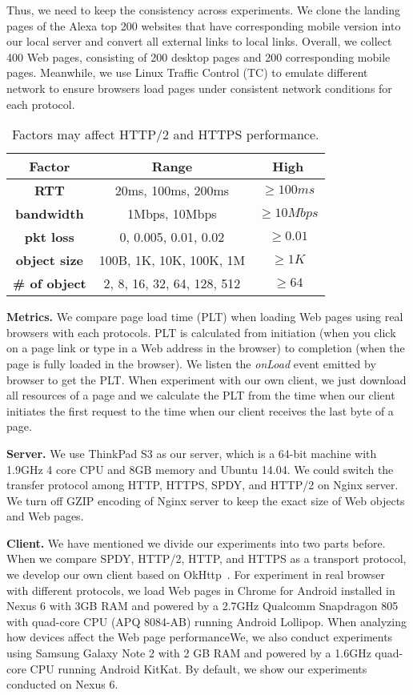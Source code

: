 Thus, we need to keep the consistency across experiments. We clone the landing pages of the Alexa top 200 websites that have corresponding mobile version into our local server and convert all external links to local links. Overall, we collect 400 Web pages, consisting of 200 desktop pages and 200 corresponding mobile pages. Meanwhile, we use Linux Traffic Control (TC) to emulate different network to ensure browsers load pages under consistent network conditions for each protocol.

\begin{table}[!htbp]\centering
\caption{Factors may affect HTTP/2 and HTTPS performance.}\label{tab:factors}
\normalsize
\begin{tabular}{|c|c|c|}
\toprule
    \textbf{Factor} & \textbf{Range} & \textbf{High}\\
\midrule
    \textbf{RTT} & 20ms, 100ms, 200ms & $ \geq 100ms $\\
    \hline
    \textbf{bandwidth} & 1Mbps, 10Mbps & $ \geq 10Mbps $\\
    \hline
    \textbf{pkt loss} & 0, 0.005, 0.01, 0.02 & $ \geq 0.01 $\\
    \hline
    \textbf{object size} & 100B, 1K, 10K, 100K, 1M & $ \geq 1K $\\
    \hline
    \textbf{\# of object} & 2, 8, 16, 32, 64, 128, 512 & $ \geq 64 $\\
\bottomrule
\end{tabular}
\end{table}

\textbf{Metrics.} We compare page load time (PLT) when loading Web pages using real browsers with each protocols. PLT is calculated from initiation (when you click on a page link or type in a Web address in the browser) to completion (when the page is fully loaded in the browser). We listen the \textit{onLoad} event emitted by browser to get the PLT. When experiment with our own client, we just download all resources of a page and we calculate the PLT from the time when our client initiates the first request to the time when our client receives the last byte of a page.

\textbf{Server.} We use ThinkPad S3 as our server, which is a 64-bit machine with 1.9GHz 4 core CPU and 8GB memory and Ubuntu 14.04. We could switch the transfer protocol among HTTP, HTTPS, SPDY, and HTTP/2 on Nginx server. We turn off GZIP encoding of Nginx server to keep the exact size of Web objects and Web pages.

\textbf{Client.} We have mentioned we divide our experiments into two parts before. When we compare SPDY, HTTP/2, HTTP, and HTTPS as a transport protocol, we develop our own client based on OkHttp~\cite{okhttp}. For experiment in real browser with different protocols, we load Web pages in Chrome for Android installed in Nexus 6 with 3GB RAM and powered by a 2.7GHz Qualcomm Snapdragon 805 with quad-core CPU (APQ 8084-AB) running Android Lollipop. When analyzing how devices affect the Web page performanceWe, we also conduct experiments using Samsung Galaxy Note 2 with 2 GB RAM and powered by a 1.6GHz quad-core CPU running Android KitKat. By default, we show our experiments conducted on Nexus 6. 

